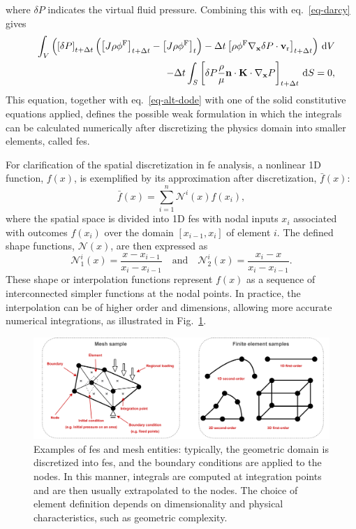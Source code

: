 \documentclass[12pt,a4paper]{report}
\begin{document}
%
where $\delta P$ indicates the virtual fluid pressure. Combining this with eq.~\ref{eq-darcy} gives
%
\begin{eqnarray}
    & & \int_V \left( \left[ \delta P \right]_{t+\Delta t} \left( \left[ J \rho \phi^{\rm F} \right]_{t+\Delta t} - \left[ J \rho \phi^{\rm F} \right]_{t} \right) - \Delta t \left[ \rho \phi^{\rm F} \nabla_{\mathbf{x}} \delta P \cdot \mathbf{v}_{\rm r} \right]_{t+\Delta t} \right) \, \mathrm{d}V \nonumber \\
    & & - \Delta t \int_S \left[ \delta P \frac{\rho}{\mu } \mathbf{n} \cdot \mathbf{K} \cdot \nabla_\mathbf{x} P \right]_{t+\Delta t} \, \mathrm{d}S = 0,\label{eq-fluid-2}
\end{eqnarray}
%
This equation, together with eq.~\ref{eq-alt-dode} with one of the solid constitutive equations applied, defines the possible weak formulation in which the integrals can be calculated numerically after discretizing the physics domain into smaller elements, called \ac{fe}s.

For clarification of the spatial discretization in \ac{fe} analysis, a nonlinear 1D function, \( f(x) \), is exemplified by its approximation after discretization, \( \bar{f}(x) \):
%
\begin{equation}\label{eq-alt-shape}
    \bar{f}(x) = \sum_{i=1}^{n} \mathcal{N}^{i}(x) f(x_i),
\end{equation}
%
where the spatial space is divided into 1D \ac{fe}s with nodal inputs \( x_i \) associated with outcomes \( f(x_i) \) over the domain \( [x_{i-1}, x_i] \) of element $i$. The defined shape functions, \( \mathcal{N}(x) \), are then expressed as
%
\begin{equation}
    \mathcal{N}_1^{i}(x) = \frac{x - x_{i-1}}{x_i - x_{i-1}} 
    \quad \text{and} \quad 
    \mathcal{N}_2^{i}(x) = \frac{x_i - x}{x_i - x_{i-1}}.
\end{equation}
%
These shape or interpolation functions represent \( f(x) \) as a sequence of interconnected simpler functions at the nodal points. In practice, the interpolation can be of higher order and dimensions, allowing more accurate numerical integrations, as illustrated in Fig.~\ref{fea}.
%
\begin{figure}
\includegraphics[width=1\linewidth]{fea.png}
\caption{Examples of \acp{fe} and mesh entities: typically, the geometric domain is discretized into \acp{fe}, and the boundary conditions are applied to the nodes. In this manner, integrals are computed at integration points and are then usually extrapolated to the nodes. The choice of element definition depends on dimensionality and physical characteristics, such as geometric complexity.}
\label{fea}
\end{figure}
\end{document}
